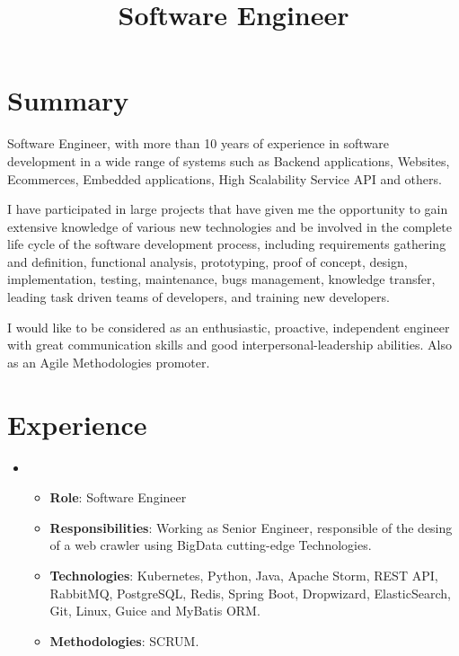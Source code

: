 \documentclass[11pt,a4paper,sans]{moderncv}        %
\title{Software Engineer}                               %
\begin{document}
\makecvtitle

\section{Summary}
Software Engineer, with more than 10 years of experience in software development in a wide range of systems 
such as Backend applications, Websites, Ecommerces, Embedded applications, High Scalability Service API and
others.

\medskip I have participated in large projects that have given me the opportunity to gain extensive knowledge of various new
technologies and be involved in the complete life cycle of the software development process, including requirements
gathering and definition, functional analysis, prototyping, proof of concept, design, implementation, testing,
maintenance, bugs management, knowledge transfer, leading task driven teams of developers, and training new
developers.

\medskip I would like to be considered as an enthusiastic, proactive, independent engineer with great communication skills
and good interpersonal-leadership abilities. Also as an Agile Methodologies promoter.

\clearpage

\section{Experience}
  {
    \begin{itemize}
      \item 
        \begin{itemize}
          \item \textbf{Role}: Software Engineer
          \item \textbf{Responsibilities}: Working as Senior Engineer, responsible of the desing of a web crawler using BigData cutting-edge Technologies. 
          \item \textbf{Technologies}: Kubernetes, Python, Java, Apache Storm, REST API, RabbitMQ, PostgreSQL, Redis, Spring Boot, Dropwizard, ElasticSearch, Git, Linux, Guice and MyBatis ORM.
          \item \textbf{Methodologies}: SCRUM.
        \end{itemize}
    \end{itemize}
  }
\end{document}
